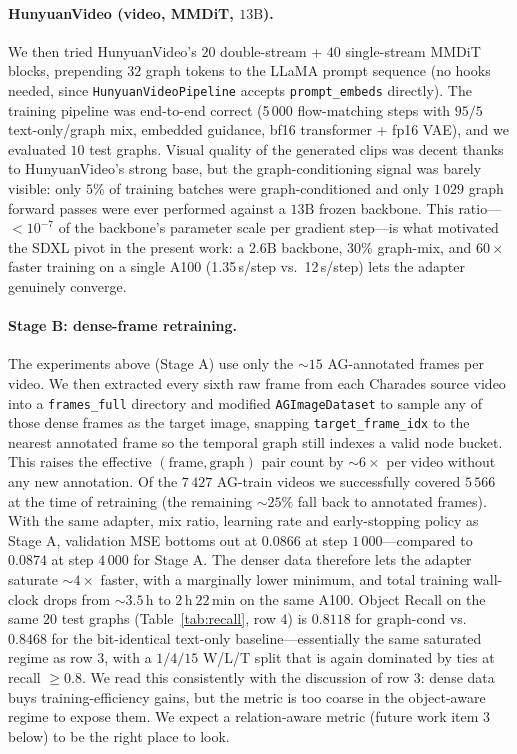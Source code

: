 \documentclass[11pt]{article}
\begin{document}
\paragraph{HunyuanVideo (video, MMDiT, $13\text{B}$).}
We then tried HunyuanVideo's $20$ double-stream + $40$ single-stream
MMDiT blocks, prepending $32$ graph tokens to the LLaMA prompt
sequence (no hooks needed, since \texttt{HunyuanVideoPipeline} accepts
\texttt{prompt\_embeds} directly).  The training pipeline was
end-to-end correct (5\,000 flow-matching steps with $95/5$
text-only/graph mix, embedded guidance, bf16 transformer + fp16 VAE),
and we evaluated $10$ test graphs. Visual quality of the generated
clips was decent thanks to HunyuanVideo's strong base, but the
graph-conditioning signal was barely visible: only $5\%$ of training
batches were graph-conditioned and only $1\,029$ graph forward passes
were ever performed against a $13\text{B}$ frozen backbone.  This
ratio---$<10^{-7}$ of the backbone's parameter scale per gradient
step---is what motivated the SDXL pivot in the present work: a
$2.6\text{B}$ backbone, $30\%$ graph-mix, and $60\!\times\!$ faster
training on a single A100 (1.35\,s/step vs.\ 12\,s/step) lets the
adapter genuinely converge.

\paragraph{Stage B: dense-frame retraining.}
The experiments above (Stage A) use only the $\sim 15$ AG-annotated
frames per video. We then extracted every sixth raw frame from each
Charades source video into a \texttt{frames\_full} directory and
modified \texttt{AGImageDataset} to sample any of those dense frames as
the target image, snapping \texttt{target\_frame\_idx} to the nearest
annotated frame so the temporal graph still indexes a valid node
bucket. This raises the effective $(\text{frame},\text{graph})$ pair
count by $\sim 6\!\times\!$ per video without any new annotation. Of
the $7\,427$ AG-train videos we successfully covered $5\,566$ at the
time of retraining (the remaining $\sim 25\%$ fall back to annotated
frames). With the same adapter, mix ratio, learning rate and
early-stopping policy as Stage A, validation MSE bottoms out at
$0.0866$ at step $1\,000$---compared to $0.0874$ at step $4\,000$ for
Stage A. The denser data therefore lets the adapter saturate
$\sim\!4\!\times\!$ faster, with a marginally lower minimum, and total
training wall-clock drops from $\sim\!3.5\,\text{h}$ to $2\,\text{h}\
22\,\text{min}$ on the same A100. Object Recall on the same $20$ test
graphs (Table~\ref{tab:recall}, row 4) is $0.8118$ for graph-cond vs.\
$0.8468$ for the bit-identical text-only baseline---essentially the
same saturated regime as row $3$, with a $1/4/15$ W/L/T split that is
again dominated by ties at recall $\geq 0.8$. We read this consistently
with the discussion of row $3$: dense data buys training-efficiency
gains, but the metric is too coarse in the object-aware regime to
expose them. We expect a relation-aware metric (future work item $3$
below) to be the right place to look.
\end{document}
